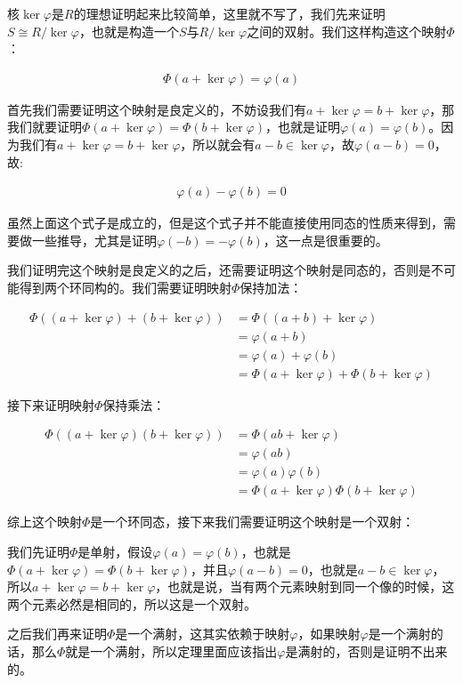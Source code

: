 \documentclass[12pt, a4paper, oneside]{ctexart}
\theoremstyle{definition}
\begin{document}
核$\ker\varphi$是$R$的理想证明起来比较简单，这里就不写了，我们先来证明$S\cong R/\ker\varphi$，也就是构造一个$S$与$R/\ker\varphi$之间的双射。我们这样构造这个映射$\Phi$：

\begin{align*}
\Phi(a+\ker\varphi)=\varphi(a)
\end{align*}

首先我们需要证明这个映射是良定义的，不妨设我们有$a+\ker\varphi=b+\ker\varphi$，那我们就要证明$\Phi(a+\ker\varphi)=\Phi(b+\ker\varphi)$，也就是证明$\varphi(a)=\varphi(b)$。因为我们有$a+\ker\varphi=b+\ker\varphi$，所以就会有$a-b\in \ker\varphi$，故$\varphi(a-b)=0$，故:

\begin{align*}
\varphi(a)-\varphi(b)=0
\end{align*}

虽然上面这个式子是成立的，但是这个式子并不能直接使用同态的性质来得到，需要做一些推导，尤其是证明$\varphi(-b)=-\varphi(b)$，这一点是很重要的。

我们证明完这个映射是良定义的之后，还需要证明这个映射是同态的，否则是不可能得到两个环同构的。我们需要证明映射$\Phi$保持加法：

\begin{align*}
\Phi((a+\ker\varphi)+(b+\ker\varphi))&=\Phi((a+b)+\ker\varphi)\\
&=\varphi(a+b)\\
&=\varphi(a)+\varphi(b)\\
&=\Phi(a+\ker\varphi)+\Phi(b+\ker\varphi)
\end{align*}

接下来证明映射$\Phi$保持乘法：

\begin{align*}
    \Phi((a+\ker\varphi)(b+\ker\varphi))&=\Phi(ab+\ker\varphi)\\
    &=\varphi(ab)\\
    &=\varphi(a)\varphi(b)\\
    &=\Phi(a+\ker\varphi)\Phi(b+\ker\varphi)
\end{align*}

综上这个映射$\Phi$是一个环同态，接下来我们需要证明这个映射是一个双射：

我们先证明$\Phi$是单射，假设$\varphi(a)=\varphi(b)$，也就是$\Phi(a+\ker\varphi)=\Phi(b+\ker\varphi)$，并且$\varphi(a-b)=0$，也就是$a-b\in \ker\varphi$，所以$a+\ker\varphi=b+\ker\varphi$，也就是说，当有两个元素映射到同一个像的时候，这两个元素必然是相同的，所以这是一个双射。

之后我们再来证明$\Phi$是一个满射，这其实依赖于映射$\varphi$，如果映射$\varphi$是一个满射的话，那么$\Phi$就是一个满射，所以定理里面应该指出$\varphi$是满射的，否则是证明不出来的。
\end{document}
